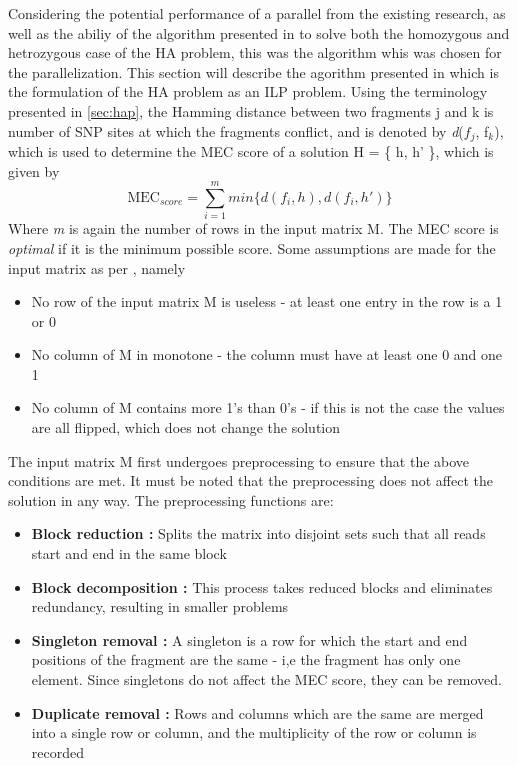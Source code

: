 \documentclass[10pt,twocolumn]{witseiepaper}
\newcommand{\M}{\textit{m }}
\newcommand{\D}{\textit{d}}
\begin{document}
Considering the potential performance of a parallel from the existing research, as well as the abiliy of the
algorithm presented in \cite{chen:2013} to solve both the homozygous and hetrozygous case of the HA problem,
this was the algorithm whis was chosen for the parallelization. This section will describe the agorithm
presented in \cite{chen:2013} which is the formulation of the HA problem as an ILP problem. Using the
terminology presented in \ref{sec:hap}, the Hamming distance between two fragments j and k is number of SNP 
sites at which the fragments conflict, and is denoted by \D($f_j$, f$_k$), which is used to determine the
MEC score of a solution H = \{ h, h' \}, which is given by
\begin{equation}
\textrm{MEC$_{score}$} = \sum_{i = 1}^{m}{ min\{ \D(f_i, h), \D(f_i, h') \} }
\end{equation}
Where \M is again the number of rows in the input matrix M. The MEC score is \textit{optimal} if it is the
minimum possible score. Some assumptions are made for the input matrix as per \cite{chen:2013}, namely
\begin{itemize}
\item{ No row of the input matrix M is useless - at least one entry in the row is a 1 or 0 
}
\item{ No column of M in monotone - the column must have at least one 0 and one 1
}
\item{ No column of M contains more 1's than 0's - if this is not the case the values are all flipped, which
    does not change the solution
}
\end{itemize}
The input matrix M first undergoes preprocessing to ensure that the above conditions are met. It must be noted
that the preprocessing does not affect the solution in any way. The preprocessing functions are:
\begin{itemize}
\item{ \textbf{Block reduction :} Splits the matrix into disjoint sets such that all reads start and end
        in the same block
}
\item{ \textbf{Block decomposition :} This process takes reduced blocks and eliminates redundancy, resulting
    in smaller problems 
}
\item{ \textbf{Singleton removal :} A singleton is a row for which the start and end positions of the fragment
    are the same - i,e the fragment has only one element. Since singletons do not affect the MEC score,
    they can be removed.
}
\item{ \textbf{Duplicate removal :} Rows and columns which are the same are merged into a single row or
        column, and the multiplicity of the row or column is recorded
}
\end{itemize}
\end{document}
